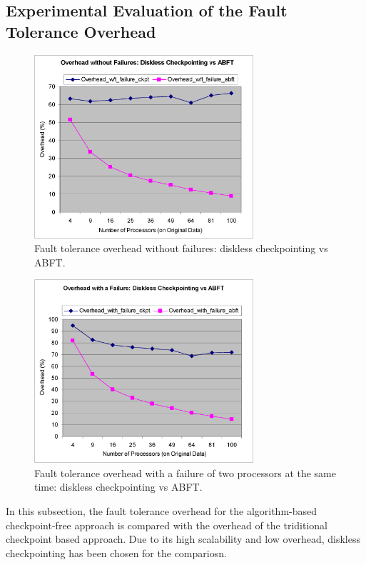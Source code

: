 \documentclass{sig-alternate}
\begin{document}
\subsection{Experimental Evaluation of the Fault Tolerance Overhead}


\begin{figure}
\centering
\includegraphics[width=3.2in]{overhead_mfailure_wt.png}
\caption{Fault tolerance overhead without failures: diskless checkpointing vs ABFT.}
\label{fig_sim}
\end{figure}

\begin{figure}
\centering
\includegraphics[width=3.2in]{overhead_mfailure_with.png}
\caption{Fault tolerance overhead with a failure of two processors at the same time: diskless checkpointing vs ABFT.}
\label{fig_sim}
\end{figure}


In this subsection, the fault tolerance overhead for the algorithm-based checkpoint-free approach 
is compared with the overhead of the triditional checkpoint based approach. Due to its high scalability and 
low overhead, diskless checkpointing has been chosen for the compariosn. 
\end{document}
